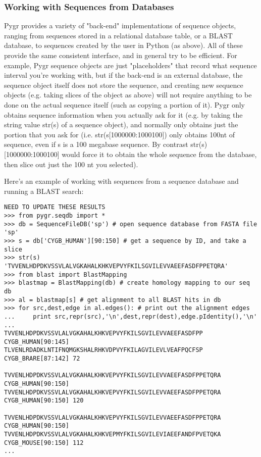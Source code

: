 \documentclass{howto}
\begin{document}
\subsubsection{Working with Sequences from Databases}

Pygr provides a variety of "back-end" implementations of sequence objects, ranging from sequences stored in a relational database table, or a BLAST database, to sequences created by the user in Python (as above).  All of these provide the same consistent interface, and in general try to be efficient.  For example, Pygr sequence objects are just "placeholders" that record what sequence interval you're working with, but if the back-end is an external database, the sequence object itself does not store the sequence, and creating new sequence objects (e.g. taking slices of the object as above) will not require anything to be done on the actual sequence itself (such as copying a portion of it).  Pygr only obtains sequence information when you actually ask for it (e.g. by taking the string value str(s) of a sequence object), and normally only obtains just the portion that you ask for (i.e. str(s[1000000:1000100]) only obtains 100nt of sequence, even if s is a 100 megabase sequence.  By contrast str(s)[1000000:1000100] would force it to obtain the whole sequence from the database, then slice out just the 100 nt you selected). 

Here's an example of working with sequences from a sequence database and
running a BLAST search:

\begin{verbatim}
NEED TO UPDATE THESE RESULTS
>>> from pygr.seqdb import *
>>> db = SequenceFileDB('sp') # open sequence database from FASTA file 'sp'
>>> s = db['CYGB_HUMAN'][90:150] # get a sequence by ID, and take a slice
>>> str(s)
'TVVENLHDPDKVSSVLALVGKAHALKHKVEPVYFKILSGVILEVVAEEFASDFPPETQRA'
>>> from blast import BlastMapping
>>> blastmap = BlastMapping(db) # create homology mapping to our seq db
>>> al = blastmap[s] # get alignment to all BLAST hits in db
>>> for src,dest,edge in al.edges(): # print out the alignment edges
...     print src,repr(src),'\n',dest,repr(dest),edge.pIdentity(),'\n'
... 
TVVENLHDPDKVSSVLALVGKAHALKHKVEPVYFKILSGVILEVVAEEFASDFPP CYGB_HUMAN[90:145] 
TLVENLRDADKLNTIFNQMGKSHALRHKVDPVYFKILAGVILEVLVEAFPQCFSP CYGB_BRARE[87:142] 72

TVVENLHDPDKVSSVLALVGKAHALKHKVEPVYFKILSGVILEVVAEEFASDFPPETQRA CYGB_HUMAN[90:150] 
TVVENLHDPDKVSSVLALVGKAHALKHKVEPVYFKILSGVILEVVAEEFASDFPPETQRA CYGB_HUMAN[90:150] 120

TVVENLHDPDKVSSVLALVGKAHALKHKVEPVYFKILSGVILEVVAEEFASDFPPETQRA CYGB_HUMAN[90:150] 
TVVENLHDPDKVSSVLALVGKAHALKHKVEPMYFKILSGVILEVIAEEFANDFPVETQKA CYGB_MOUSE[90:150] 112 
...
\end{verbatim}
\end{document}
